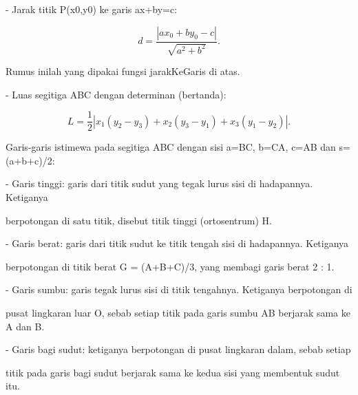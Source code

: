 \documentclass[a4paper,10pt]{article}
\begin{document}
\begin{eulernotebook}
\begin{eulercomment}
\begin{eulercomment}
\begin{eulercomment}
- Jarak titik P(x0,y0) ke garis ax+by=c:
\end{eulercomment}
\begin{eulerformula}
\[
d = \frac{|a x_0 + b y_0 - c|}{\sqrt{a^2+b^2}}.
\]
\end{eulerformula}
\begin{eulerttcomment}
  Rumus inilah yang dipakai fungsi jarakKeGaris di atas.
\end{eulerttcomment}
\begin{eulercomment}
- Luas segitiga ABC dengan determinan (bertanda):
\end{eulercomment}
\begin{eulerformula}
\[
L = \frac{1}{2}\left|x_1(y_2-y_3)+x_2(y_3-y_1)+x_3(y_1-y_2)\right|.
\]
\end{eulerformula}
\begin{eulercomment}
\begin{eulercomment}
\begin{eulercomment}
\end{eulercomment}
\begin{eulercomment}
Garis-garis istimewa pada segitiga ABC dengan sisi a=BC, b=CA, c=AB dan s=(a+b+c)/2:

- Garis tinggi: garis dari titik sudut yang tegak lurus sisi di hadapannya. Ketiganya
\end{eulercomment}
\begin{eulerttcomment}
  berpotongan di satu titik, disebut titik tinggi (ortosentrum) H.
\end{eulerttcomment}
\begin{eulercomment}
- Garis berat: garis dari titik sudut ke titik tengah sisi di hadapannya. Ketiganya
\end{eulercomment}
\begin{eulerttcomment}
  berpotongan di titik berat G = (A+B+C)/3, yang membagi garis berat 2 : 1.
\end{eulerttcomment}
\begin{eulercomment}
- Garis sumbu: garis tegak lurus sisi di titik tengahnya. Ketiganya berpotongan di
\end{eulercomment}
\begin{eulerttcomment}
  pusat lingkaran luar O, sebab setiap titik pada garis sumbu AB berjarak sama ke A dan B.
\end{eulerttcomment}
\begin{eulercomment}
- Garis bagi sudut: ketiganya berpotongan di pusat lingkaran dalam, sebab setiap
\end{eulercomment}
\begin{eulerttcomment}
  titik pada garis bagi sudut berjarak sama ke kedua sisi yang membentuk sudut itu.
\end{eulerttcomment}
\begin{eulercomment}


\end{eulercomment}
\end{eulercomment}
\end{eulercomment}
\end{eulercomment}
\end{eulercomment}
\end{eulernotebook}
\end{document}
